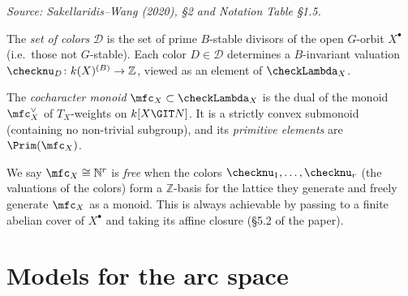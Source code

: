\begin{definition}
  \label{def:colors-monoid}
  \textit{Source: Sakellaridis--Wang (2020), §2 and Notation Table §1.5.}

  The \emph{set of colors} \( \mathcal{D} \) is the set of prime \( B \)-stable divisors of
  the open \( G \)-orbit \( X^\bullet \) (i.e.\ those not \( G \)-stable).
  Each color \( D \in \mathcal{D} \) determines a \( B \)-invariant valuation
  \( \checknu_D \colon k(X)^{(B)} \to \mathbb{Z} \), viewed as an element of
  \( \checkLambda_X \).

  The \emph{cocharacter monoid} \( \mfc_X \subset \checkLambda_X \) is the dual of the
  monoid \( \mfc_X^\vee \) of \( T_X \)-weights on \( k[X \GIT N] \).
  It is a strictly convex submonoid (containing no non-trivial subgroup), and its
  \emph{primitive elements} are \( \Prim(\mfc_X) \).

  We say \( \mfc_X \cong \mathbb{N}^r \) is \emph{free} when the colors
  \( \checknu_1, \ldots, \checknu_r \) (the valuations of the colors) form a
  \( \mathbb{Z} \)-basis for the lattice they generate and freely generate \( \mfc_X \) as a
  monoid.  This is always achievable by passing to a finite abelian cover of \( X^\bullet \)
  and taking its affine closure (§5.2 of the paper).
\end{definition}


\section{Models for the arc space}

